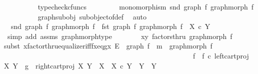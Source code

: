 \begin{isabellebody}
\ \ \ \ \ \ \ \ \isamarkupfalse%
\ typecheck{\isacharunderscore}{\kern0pt}cfuncs\ \isanewline
\ \ \ \ \ \ \isamarkupfalse%
\ {\isachardoublequoteopen}monomorphism\ {\isacharparenleft}{\kern0pt}snd\ {\isacharparenleft}{\kern0pt}graph\ f{\isacharcomma}{\kern0pt}\ graph{\isacharunderscore}{\kern0pt}morph\ f{\isacharparenright}{\kern0pt}{\isacharparenright}{\kern0pt}{\isachardoublequoteclose}\isanewline
\ \ \ \ \ \ \ \ \isamarkupfalse%
\ graph{\isacharunderscore}{\kern0pt}subobj\ subobject{\isacharunderscore}{\kern0pt}of{\isacharunderscore}{\kern0pt}def\ \isamarkupfalse%
\ auto\isanewline
\ \ \ \ \ \ \isamarkupfalse%
\ {\isachardoublequoteopen}\ snd\ {\isacharparenleft}{\kern0pt}graph\ f{\isacharcomma}{\kern0pt}\ graph{\isacharunderscore}{\kern0pt}morph\ f{\isacharparenright}{\kern0pt}\ {\isacharcolon}{\kern0pt}\ fst\ {\isacharparenleft}{\kern0pt}graph\ f{\isacharcomma}{\kern0pt}\ graph{\isacharunderscore}{\kern0pt}morph\ f{\isacharparenright}{\kern0pt}\ {\isasymrightarrow}\ X\ {\isasymtimes}\isactrlsub c\ Y{\isachardoublequoteclose}\isanewline
\ \ \ \ \ \ \ \ \isamarkupfalse%
\ {\isacharparenleft}{\kern0pt}simp\ add{\isacharcolon}{\kern0pt}\ assms\ graph{\isacharunderscore}{\kern0pt}morph{\isacharunderscore}{\kern0pt}type{\isacharparenright}{\kern0pt}\isanewline
\ \ \ \ \ \ \isamarkupfalse%
\ {\isachardoublequoteopen}{\isasymlangle}x{\isacharcomma}{\kern0pt}y{\isasymrangle}\ factorsthru\ graph{\isacharunderscore}{\kern0pt}morph\ f{\isachardoublequoteclose}\isanewline
\ \ \ \ \ \ \isamarkupfalse%
{\isacharparenleft}{\kern0pt}subst\ xfactorthru{\isacharunderscore}{\kern0pt}equalizer{\isacharunderscore}{\kern0pt}iff{\isacharunderscore}{\kern0pt}fx{\isacharunderscore}{\kern0pt}eq{\isacharunderscore}{\kern0pt}gx{\isacharbrackleft}{\kern0pt}\ E\ {\isacharequal}{\kern0pt}\ {\isachardoublequoteopen}graph\ f{\isachardoublequoteclose}{\isacharcomma}{\kern0pt}\ \ m\ {\isacharequal}{\kern0pt}\ {\isachardoublequoteopen}graph{\isacharunderscore}{\kern0pt}morph\ f{\isachardoublequoteclose}{\isacharcomma}{\kern0pt}\ \ \isanewline
\ \ \ \ \ \ \ \ \ \ \ \ \ \ \ \ \ \ \ \ \ \ \ \ \ \ \ \ \ \ \ \ \ \ \ \ \ \ \ \ \ \ \ \ \ \ \ \ \ \ \ \ \ \ f\ {\isacharequal}{\kern0pt}\ {\isachardoublequoteopen}{\isacharparenleft}{\kern0pt}f\ {\isasymcirc}\isactrlsub c\ left{\isacharunderscore}{\kern0pt}cart{\isacharunderscore}{\kern0pt}proj\ X\ Y{\isacharparenright}{\kern0pt}{\isachardoublequoteclose}{\isacharcomma}{\kern0pt}\ \ g\ {\isacharequal}{\kern0pt}\ {\isachardoublequoteopen}right{\isacharunderscore}{\kern0pt}cart{\isacharunderscore}{\kern0pt}proj\ X\ Y{\isachardoublequoteclose}{\isacharcomma}{\kern0pt}\ \ X\ {\isacharequal}{\kern0pt}\ {\isachardoublequoteopen}X\ {\isasymtimes}\isactrlsub c\ Y{\isachardoublequoteclose}{\isacharcomma}{\kern0pt}\ \ Y\ {\isacharequal}{\kern0pt}\ Y{\isacharcomma}{\kern0pt}\isanewline

\end{isabellebody}
